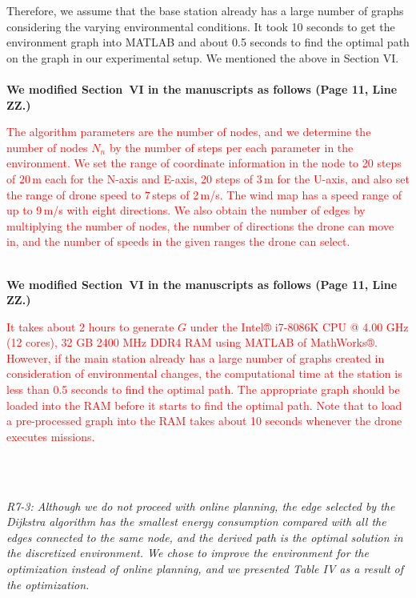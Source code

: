 \documentclass[onecolumn]{IEEEconf}
\begin{document}
\begin{description}
{    Therefore, we assume that the base station already has a large number of graphs considering the varying environmental conditions. It took 10 seconds to get the environment graph into MATLAB and about 0.5 seconds to find the optimal path on the graph in our experimental setup. We mentioned the above in Section VI.
	}
	~\\
	~\\
	\textbf{We modified Section~VI in the manuscripts as follows (Page 11, Line ZZ.)}\\
    \begin{mdframed}[ linewidth=.75pt, userdefinedwidth=0.9\textwidth]
    \textcolor{red}{The algorithm parameters are the number of nodes, and we determine the number of nodes $N_n$ by the number of steps per each parameter in the environment.  
    We set the range of coordinate information in the node to 20 steps of 20\,m each for the N-axis and E-axis, 20 steps of 3\,m for the U-axis, and also set the range of drone speed to 7\,steps of 2\,m/s. 
    The wind map has a speed range of up to 9\,m/s with eight directions.
    We also obtain the number of edges by multiplying the number of nodes, the number of directions the drone can move in, and the number of speeds in the given ranges the drone can select.
    }
    \end{mdframed} 
    ~\\
	\textbf{We modified Section~VI in the manuscripts as follows (Page 11, Line ZZ.)}\\
    \begin{mdframed}[ linewidth=.75pt, userdefinedwidth=0.9\textwidth]
    \textcolor{red}{It takes about 2 hours to generate $G$ under the Intel® i7-8086K CPU @ 4.00 GHz (12 cores), 32 GB 2400 MHz DDR4 RAM using MATLAB of MathWorks®. 
    However, if the main station already has a large number of graphs created in consideration of environmental changes, the computational time at the station is less than 0.5 seconds to find the optimal path. The appropriate graph should be loaded into the RAM before it starts to find the optimal path. Note that to load a pre-processed graph into the RAM takes about 10 seconds whenever the drone executes missions.
    }
    \end{mdframed} 
    ~\\
    ~\\
	\item \textit
	{
	R7-3: Although we do not proceed with online planning, the edge selected by the Dijkstra algorithm has the smallest energy consumption compared with all the edges connected to the same node, and the derived path is the optimal solution in the discretized environment. We chose to improve the environment for the optimization instead of online planning, and we presented Table IV as a result of the optimization. 
}
\end{description}
\end{document}
